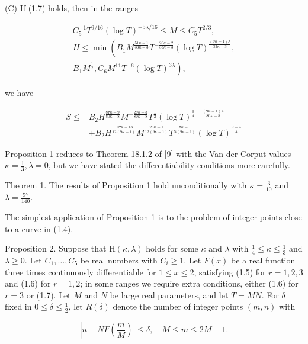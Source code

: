 \documentclass[10pt]{article}
\begin{document}
(C) If (1.7) holds, then in the ranges


\begin{gather*}
C_{5}^{-1} T^{9 / 16}(\log T)^{-5 \lambda / 16} \leqslant M \leqslant C_{5} T^{2 / 3},  \tag{1.18}\\
H \leqslant \min \left(B_{1} M^{\frac{51 \kappa-1}{33 \kappa-3}} T^{-\frac{20 \kappa-2}{33 \kappa-3}}(\log T)^{\frac{(9 \kappa-1) \lambda}{33 \kappa-3}},\right. \\
\left.B_{1} M^{\frac{1}{2}}, C_{6} M^{11} T^{-6}(\log T)^{3 \lambda}\right), \tag{1.19}
\end{gather*}


we have


\begin{align*}
S \leqslant & B_{2} H^{\frac{87 \kappa-9}{80 \kappa-8}} M^{-\frac{29 \kappa-3}{80 \kappa-8}} T^{\frac{1}{2}}(\log T)^{\frac{9}{4}+\frac{(9 \kappa-1) \lambda}{80 \kappa-8}} \\
& +B_{2} H^{\frac{107 \kappa-13}{12(9 \kappa-1)}} M^{\frac{23 \kappa-1}{12(9 \kappa-1)}} T^{\frac{7 \kappa-1}{4(9 \kappa-1)}}(\log T)^{\frac{9+\lambda}{4}} \tag{1.20}
\end{align*}


Proposition 1 reduces to Theorem 18.1.2 of [9] with the Van der Corput values $\kappa=\frac{1}{3}, \lambda=0$, but we have stated the differentiability conditions more carefully.

Theorem 1. The results of Proposition 1 hold unconditionally with $\kappa=\frac{3}{10}$ and $\lambda=\frac{57}{140}$.

The simplest application of Proposition 1 is to the problem of integer points close to a curve in (1.4).

Proposition 2. Suppose that $\mathrm{H}(\kappa, \lambda)$ holds for some $\kappa$ and $\lambda$ with $\frac{1}{4} \leqslant \kappa \leqslant \frac{1}{3}$ and $\lambda \geqslant 0$. Let $C_{1}, \ldots, C_{5}$ be real numbers with $C_{i} \geqslant 1$. Let $F(x)$ be a real function three times continuously differentiable for $1 \leqslant x \leqslant 2$, satisfying (1.5) for $r=1,2,3$ and (1.6) for $r=1,2$; in some ranges we require extra conditions, either (1.6) for $r=3$ or (1.7). Let $M$ and $N$ be large real parameters, and let $T=M N$. For $\delta$ fixed in $0 \leqslant \delta \leqslant \frac{1}{2}$, let $R(\delta)$ denote the number of integer points $(m, n)$ with


\begin{equation*}
\left|n-N F\left(\frac{m}{M}\right)\right| \leqslant \delta, \quad M \leqslant m \leqslant 2 M-1. \tag{1.21}
\end{equation*}
\end{document}
